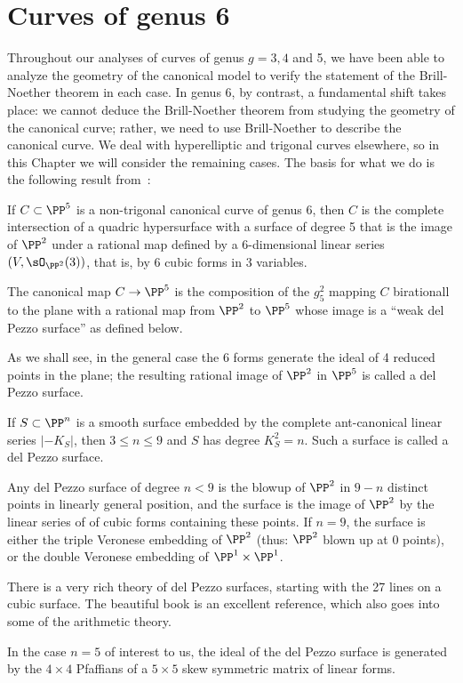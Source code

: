 

\chapter{Curves of genus 6}\label{genus 6 chapter}


Throughout our analyses of curves of genus $g = 3, 4$ and 5, we have been able to analyze the geometry of the canonical model to verify the statement of the Brill-Noether theorem in each case. In genus 6, by contrast, a fundamental shift takes place: we cannot deduce the Brill-Noether theorem from studying the geometry of the canonical curve; rather, we need to use Brill-Noether to describe the canonical curve. We deal with hyperelliptic and trigonal curves elsewhere, so in this Chapter we will consider the remaining cases. The basis for what we do is the following result from~\cite{MR744297}:

\begin{theorem}
If $C\subset \PP^5$ is a non-trigonal canonical curve of genus 6, then $C$ is the complete intersection of a quadric hypersurface
with a surface of degree 5 that is the image of $\PP^2$ under a rational map defined by a 6-dimensional linear series
$(V,\sO_{\PP^2}(3))$, that is, by 6 cubic forms in 3 variables. 

The canonical map $C\to \PP^5$ is the composition
of the $g^2_5$ mapping $C$ birationall to the plane with a rational map from $\PP^2$ to $\PP^5$ whose image is a 
``weak del Pezzo surface'' as defined below.
\end{theorem}

As we shall see, in the general case the 6 forms generate the ideal of 4 reduced points in the plane; the resulting rational
image of $\PP^2$ in $\PP^5$ is called a del Pezzo surface. 

\begin{fact}
If $S\subset \PP^n$ is a smooth surface embedded by the complete ant-canonical linear series $|-K_S|$, then
$3\leq n\leq 9$ and $S$ has degree $K_S^2 = n$. Such a surface is called a 
del Pezzo surface.

Any del Pezzo surface of degree $n<9$ is the blowup of $\PP^2$
in $9-n$ distinct points in linearly general position, 
and the surface is the image of $\PP^2$ by  the linear series of of cubic forms containing these points. If $n=9$, the surface
is either the triple Veronese embedding of $\PP^2$ (thus: $\PP^2$ blown up at 0 points), or the double Veronese embedding of
$\PP^1\times \PP^1$.  

There is a very rich theory of del Pezzo surfaces, starting with the 27 lines on a cubic surface. The
beautiful book \cite{Manin} is an excellent reference, which also goes into some of the arithmetic theory.

In the case $n=5$ of interest to us, the ideal of the del Pezzo surface 
is generated by the $4\times 4$ Pfaffians of a $5\times 5$ skew symmetric matrix of linear forms. 
\end{fact}

